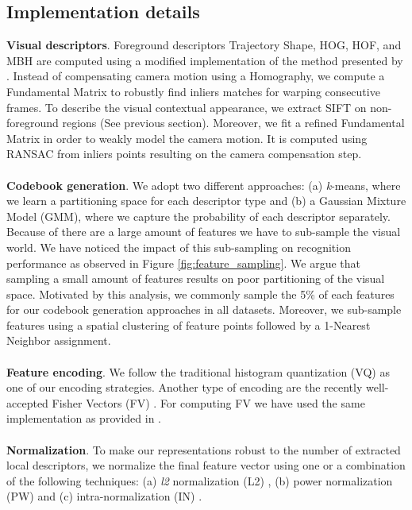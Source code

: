 \subsection{Implementation details}

\textbf{Visual descriptors}. Foreground descriptors \ie Trajectory Shape, HOG, HOF, and MBH are computed using a modified implementation of the method presented by \cite{wang2013}. Instead of compensating camera motion using a Homography, we compute a Fundamental Matrix to robustly find inliers matches for warping consecutive frames. To describe the visual contextual appearance, we extract SIFT \cite{lowe2004} on non-foreground regions (See previous section). Moreover, we fit a refined Fundamental Matrix in order to weakly model the camera motion. It is computed using RANSAC from inliers points resulting on the camera compensation step. \\\\
\textbf{Codebook generation}. We adopt two different approaches: (a) \textit{k}-means, where we learn a partitioning space for each descriptor type and (b) a Gaussian Mixture Model (GMM), where we capture the probability of each descriptor separately. Because of there are a large amount of features we have to sub-sample the visual world. We have noticed the impact of this sub-sampling on recognition performance as observed in Figure \ref{fig:feature_sampling}. We argue that sampling a small amount of features results on poor partitioning of the visual space. Motivated by this analysis, we commonly sample the 5\% of each features for our codebook generation approaches in all datasets. Moreover, we sub-sample features using a spatial clustering of feature points followed by a 1-Nearest Neighbor assignment. \\\\
\textbf{Feature encoding}. We follow the traditional histogram quantization (VQ) as one of our encoding strategies. Another type of encoding are the recently well-accepted Fisher Vectors (FV) \cite{perronnin2010}. For computing FV we have used the same implementation as provided in \cite{perronnin2010}. \\\\
\textbf{Normalization}. To make our representations robust to the number of extracted local descriptors, we normalize the final feature vector using one or a combination of the following techniques: (a) \textit{l2} normalization (L2) \cite{perronnin2010}, (b) power normalization (PW) \cite{perronnin2010} and (c) intra-normalization (IN) \cite{xwang2013}. \\\\
